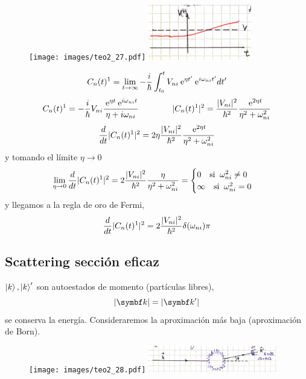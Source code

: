 \documentclass[10pt,oneside]{CBFT_book}
\begin{document}
\begin{figure}[htb]
	\begin{center}
	\texttt{[image: images/teo2\_27.pdf]}
	\includegraphics[width=0.4\textwidth]{images/fig_ft2_desdoblamiento_3.jpg}
	\end{center}
	\caption{}
\end{figure} 
\[
	C_n(t)^1 = \lim_{t\to\infty} -\frac{i}{\hbar} 
		\int_{t_0}^t V_{ni} \:\mathrm{e}^{\eta t'} \:\mathrm{e}^{i\omega_{ni} t'} dt'
\]
\[
	C_n(t)^1 = -\frac{i}{\hbar} V_{ni} \frac{\:\mathrm{e}^{\eta t} \:\mathrm{e}^{i\omega_{ni} t} }{\eta+i\omega_{ni}}
	\qquad \qquad 
 	|C_n(t)^1|^2 = \frac{|V_{ni}|^2}{\hbar^2} \frac{\:\mathrm{e}^{2\eta t} }{\eta^2 + \omega_{ni}^2 }
\]
\[
	\frac{d^{\hspace{-0.05em}} {}}{d {t}^{\hspace{-0.05em}}}|C_n(t)^1|^2 = 2 \eta \frac{|V_{ni}|^2}{\hbar^2} \frac{\:\mathrm{e}^{2\eta t} }{\eta^2 + \omega_{ni}^2 }
\]
y tomando el límite $\eta \to 0$ 
\[
	\lim_{\eta\to 0} \frac{d^{\hspace{-0.05em}} {}}{d {t}^{\hspace{-0.05em}}}|C_n(t)^1|^2 = 2 \frac{|V_{ni}|^2}{\hbar^2} 
			\frac{\eta }{\eta^2 + \omega_{ni}^2 } = \begin{cases}
	                    0 \quad \text{si}\;\; \omega_{ni}^2 \neq 0 \\
	                    \infty \quad \text{si}\;\; \omega_{ni}^2 = 0
	                   \end{cases}
\]
y llegamos a la regla de oro de Fermi,
\[
	\frac{d^{\hspace{-0.05em}} {}}{d {t}^{\hspace{-0.05em}}}|C_n(t)^1|^2 = 2 \frac{|V_{ni}|^2}{\hbar^2} \delta(\omega_{ni}) \pi
\]

\subsection{Scattering sección eficaz}

$\Ket{k},\Ket{k}'$ son autoestados de momento (partículas libres),
\[
	|\vb{k}| = |\vb{k}'| 
\]
se conserva la energía. Consideraremos la aproximación más baja (aproximación de Born).
\begin{figure}[htb]
	\begin{center}
	\texttt{[image: images/teo2\_28.pdf]}
	\includegraphics[width=0.5\textwidth]{images/fig_ft2_scattering_section.jpg}
	\end{center}
	\caption{}
\end{figure} 
\end{document}
